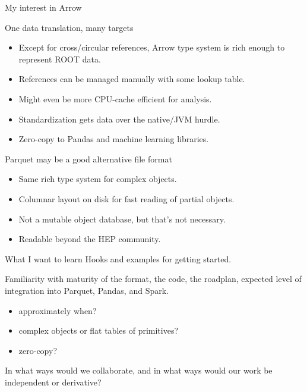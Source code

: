 \documentclass{beamer}
\begin{document}
\begin{frame}{My interest in Arrow}
\vspace{0.4 cm}
\begin{block}{One data translation, many targets}
\begin{itemize}
\item Except for cross/circular references, Arrow type system is rich enough to represent ROOT data.
\item References can be managed manually with some lookup table.
\item Might even be more CPU-cache efficient for analysis.
\item Standardization gets data over the native/JVM hurdle.
\item Zero-copy to Pandas and machine learning libraries.
\end{itemize}
\end{block}

\begin{block}{Parquet may be a good alternative file format}
\begin{itemize}
\item Same rich type system for complex objects.
\item Columnar layout on disk for fast reading of partial objects.
\item Not a mutable object database, but that's not necessary.
\item Readable beyond the HEP community.
\end{itemize}
\end{block}
\end{frame}

\begin{frame}{What I want to learn}
\vspace{0.5 cm}
Hooks and examples for getting started.

\vspace{1 cm}
Familiarity with maturity of the format, the code, the roadplan, expected level of integration into Parquet, Pandas, and Spark.
\begin{itemize}
\item approximately when?
\item complex objects or flat tables of primitives?
\item zero-copy?
\end{itemize}

\vspace{1 cm}
In what ways would we collaborate, and in what ways would our work be independent or derivative?
\end{frame}
\end{document}
